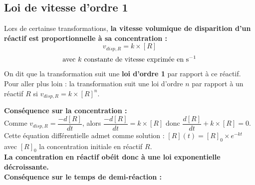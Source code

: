 \documentclass[a4paper,13pt,fleqn]{scrartcl}%
\begin{document}
    \subsection{Loi de vitesse d'ordre 1}
    \begin{minipage}{.6\linewidth}
    Lors de certainse transformations, \textbf{la vitesse volumique de disparition d'un réactif est proportionnelle à sa concentration :}
    $$v_{disp,R} = k \times [R]$$
    $$\text{avec $k$ constante de vitesse exprimée en \unit{\per\second}}$$
    On dit que la transformation suit une \textbf{loi d'ordre 1} par rapport à ce réactif.\\
    \textcolor{gray!80}{Pour aller plus loin : la transformation suit une loi d'ordre $n$ par rapport à un réactif $R$ si $v_{disp,R} = k \times [R]^n$.}\\
    \end{minipage}
    \begin{minipage}{.4\linewidth}
        \centering
    \end{minipage}
    
    \textbf{Conséquence sur la concentration :}\\
    Comme $v_{disp,R} = \dfrac{-d[R]}{dt}$, alors $\dfrac{-d[R]}{dt} = k\times [R]$ donc $\dfrac{d[R]}{dt} + k\times [R] = 0$.\\
    Cette équation différentielle admet comme solution : $[R](t)=[R]_0 \times e^{-kt}$ avec $[R]_0$ la concentration initiale en réactif $R$.\\
    \textbf{La concentration en réactif obéit donc à une loi exponentielle décroissante.}\\

    \textbf{Conséquence sur le temps de demi-réaction :}
    
\end{document}
